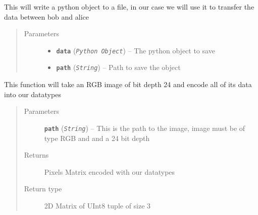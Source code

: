 \documentclass[letterpaper,10pt,english]{sphinxmanual}
\begin{document}

\begin{fulllineitems}
\label{demo:demo.ImageUtils.dump}
This will write a python object to a file, in our case we will use it to transfer the data between bob and alice
\begin{quote}\begin{description}
\item[{Parameters}] \leavevmode\begin{itemize}
\item {} 
\textbf{\texttt{data}} (\emph{\texttt{Python Object}}) -- The python object to save

\item {} 
\textbf{\texttt{path}} (\emph{\texttt{String}}) -- Path to save the object

\end{itemize}

\end{description}\end{quote}

\end{fulllineitems}


\begin{fulllineitems}
\label{demo:demo.ImageUtils.encode}
This function will take an RGB image of bit depth 24 and encode all of its data into our datatypes
\begin{quote}\begin{description}
\item[{Parameters}] \leavevmode
\textbf{\texttt{path}} (\emph{\texttt{String}}) -- This is the path to the image, image must be of type RGB and and a 24 bit depth

\item[{Returns}] \leavevmode
Pixels Matrix encoded with our datatypes

\item[{Return type}] \leavevmode
2D Matrix of UInt8 tuple of size 3

\end{description}\end{quote}

\end{fulllineitems}
\end{document}
